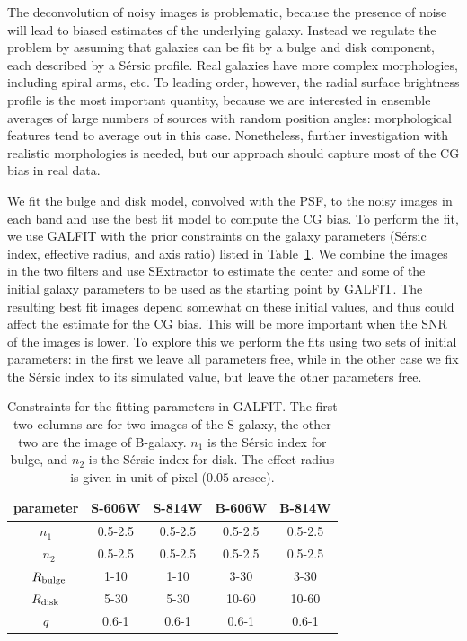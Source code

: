 \documentclass[useAMS,usenatbib]{mnras}
\begin{document}
The deconvolution of noisy images is problematic, because the presence of noise will lead to biased estimates of the underlying galaxy. Instead we regulate the problem by assuming that galaxies can be fit by a bulge and disk component, each described by a S{\'e}rsic profile. Real galaxies have more complex morphologies, including spiral arms, etc. To leading order, however, the radial surface brightness profile is the most important quantity, because we are interested in ensemble averages of large numbers of sources with random position angles: morphological features tend to average out in this case. Nonetheless, further investigation with realistic morphologies is needed, but our approach should capture most of the CG bias in real data.

We fit the bulge and disk model, convolved with the PSF, to  the noisy images in each band and use the best fit model to compute the CG bias. To perform the fit, we use {\sc GALFIT} \citep{Peng10} with
the prior constraints on the galaxy parameters (S{\'e}rsic index, effective radius, and axis ratio) listed in Table~\ref{fitpar}. We combine the images in the two filters and use {\sc SExtractor} to estimate the center and some of the initial galaxy parameters to be used as the starting point by {\sc GALFIT}. The resulting best fit images depend somewhat on these initial values, and thus could affect the  estimate for the CG bias. This will be more important when the SNR of the images is lower. To explore this we perform the fits using two sets of initial parameters: in the first we leave all parameters free, while in the other case we fix the S{\'e}rsic index to its simulated value, but leave the other parameters free.
%
\begin{table}
\begin{center}
\begin{tabular}{ccc|cc}
\hline\hline
parameter &S-606W  & S-814W  & B-606W & B-814W \\ \hline
$n_1$ &0.5-2.5  &0.5-2.5  &0.5-2.5 &0.5-2.5 \\ \
$n_2$ &0.5-2.5  &0.5-2.5  &0.5-2.5 &0.5-2.5 \\ \
$R_{\rm bulge}$ &1-10 &1-10  &3-30  &3-30  \\
$R_{\rm disk}$  &5-30 &5-30  &10-60 &10-60 \\
$q$      &0.6-1  &0.6-1  &0.6-1 &0.6-1 \\
\hline
\end{tabular}
\caption{\label{fitpar} Constraints for the fitting parameters in {\sc GALFIT}.
The first two columns are for two images of the S-galaxy, the other two are
the image of B-galaxy.
$n_1$ is the S{\'e}rsic index for bulge, and $n_2$ is the S{\'e}rsic index for disk.
The effect radius is given in unit of pixel ($0.05$ arcsec).}
\end{center}
\end{table}
\end{document}
